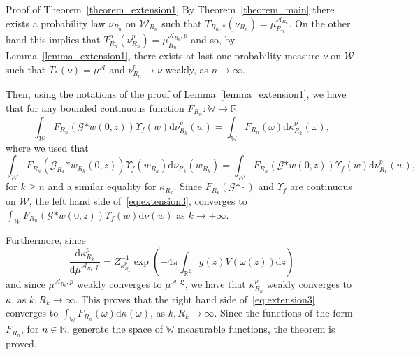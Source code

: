 \documentclass[a4paper,10pt]{article}
\newcommand{\asterisk}{\mathord{*}}
\newcommand{\mathd}{\mathrm{d}}
\newenvironment{proof*}[1]{\noindent\textbf{#1\ }}{\hspace*{\fill}$\Box$\medskip}
\begin{document}
\begin{proof*}{Proof of Theorem~\ref{theorem_extension1}}
  By Theorem~\ref{theorem_main} there exists a probability law $\nu_{R_n}$ on
  $\mathcal{W}_{R_n}$ such that $T_{R_n, \asterisk} (\nu_{R_n}) =
  \mu^{\mathcal{A}_{R_n}}_{R_n}$. On the other hand this implies that
  $T^p_{R_n} (\nu_{R_n}^p) = \mu^{\mathcal{A}_{R_n}, p}_{R_n}$ and so, by
  Lemma~\ref{lemma_extension1}, there exists at last one probability measure
  $\nu$ on $\mathcal{W}$ such that $T_{\asterisk} (\nu) = \mu^{\mathcal{A}}$
  and $\nu^p_{R_n} \rightarrow \nu$ weakly, as $n \rightarrow \infty$.
  
  Then, using the notations of the proof of Lemma~\ref{lemma_extension1}, we
  have that for any bounded continuous function $F_{R_n} : \mathbb{W}
  \rightarrow \mathbb{R}$
  \begin{equation}
    \int_{\mathcal{W}} F_{R_n} (\mathcal{G} \asterisk w (0, z)) \Upsilon_f (w)
    \mathd \nu^p_{R_k} (w) = \int_{\mathbb{W}} F_{R_n} (\omega) \mathd
    \kappa_{R_k}^p (\omega), \label{eq:extension3}
  \end{equation}
  where we used that
  \[ \int_{\mathcal{W}} F_{R_n} (\mathcal{G}_{R_k} \asterisk w_{R_k} (0, z))
     \Upsilon_f (w_{R_k}) \mathd \nu_{R_k} (w_{R_k}) = \int_{\mathcal{W}}
     F_{R_n} (\mathcal{G} \asterisk w (0, z)) \Upsilon_f (w) \mathd
     \nu^p_{R_k} (w), \]
  for $k \geqslant n$ and a similar equality for $\kappa_{R_k}$. Since
  $F_{R_k} (\mathcal{G} \asterisk \cdot)$ and $\Upsilon_f$ are continuous on
  $\mathcal{W}$, the left hand side of~{\eqref{eq:extension3}}, converges to
  $\int_{\mathcal{W}} F_{R_n} (\mathcal{G} \asterisk w (0, z)) \Upsilon_f (w)
  \mathd \nu (w)$ as $k \rightarrow + \infty$.
  
  Furthermore, since
  \[ \left. \frac{\mathd \kappa_{R_k}^p}{\mathd \mu^{\mathcal{A}_{R_k}, p}} =
     Z^{- 1}_{\kappa_{R_k}^p} \right. \left. \exp \left( - 4 \pi
     \int_{\mathbb{R}^2} g (z) V (\omega (z)) \mathd z \right) \right. \]
  and since $\mu^{\mathcal{A}_{R_k} \mathfrak{,} p}$ weakly converges to
  $\mu^{\mathcal{A}, \mathfrak{L}}$, we have that $\kappa^p_{R_k}$ weakly
  converges to $\kappa$, as $k, R_k \rightarrow \infty$. This proves that the
  right hand side of~{\eqref{eq:extension3}} converges to $\int_{\mathbb{W}}
  F_{R_n} (\omega) \mathd \kappa (\omega)$, as $k, R_k \rightarrow \infty$.
  Since the functions of the form $F_{R_n}$, for $n \in \mathbb{N}$, generate
  the space of $\mathbb{W}$ measurable functions, the theorem is proved.
\end{proof*}
\end{document}
